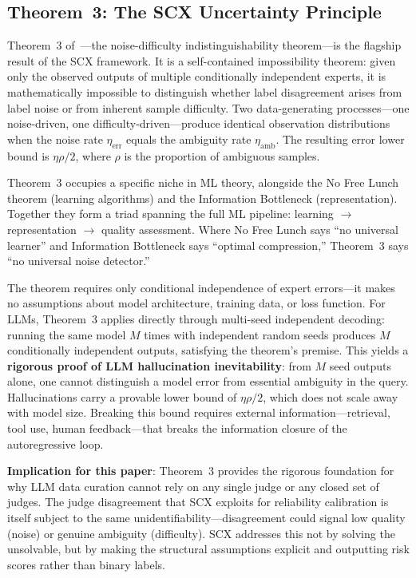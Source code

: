 \documentclass[11pt,twocolumn]{article}
\begin{document}
\subsection{Theorem~3: The SCX Uncertainty Principle}

Theorem~3 of~\cite{scx2026}---the noise-difficulty indistinguishability theorem---is the flagship result of the SCX framework. It is a self-contained impossibility theorem: given only the observed outputs of multiple conditionally independent experts, it is mathematically impossible to distinguish whether label disagreement arises from label noise or from inherent sample difficulty. Two data-generating processes---one noise-driven, one difficulty-driven---produce identical observation distributions when the noise rate $\eta_{\text{err}}$ equals the ambiguity rate $\eta_{\text{amb}}$. The resulting error lower bound is $\eta\rho/2$, where $\rho$ is the proportion of ambiguous samples.

Theorem~3 occupies a specific niche in ML theory, alongside the No Free Lunch theorem (learning algorithms) and the Information Bottleneck (representation). Together they form a triad spanning the full ML pipeline: learning $\to$ representation $\to$ quality assessment. Where No Free Lunch says ``no universal learner'' and Information Bottleneck says ``optimal compression,'' Theorem~3 says ``no universal noise detector.''

The theorem requires only conditional independence of expert errors---it makes no assumptions about model architecture, training data, or loss function. For LLMs, Theorem~3 applies directly through multi-seed independent decoding: running the same model $M$ times with independent random seeds produces $M$ conditionally independent outputs, satisfying the theorem's premise. This yields a \textbf{rigorous proof of LLM hallucination inevitability}: from $M$ seed outputs alone, one cannot distinguish a model error from essential ambiguity in the query. Hallucinations carry a provable lower bound of $\eta\rho/2$, which does not scale away with model size. Breaking this bound requires external information---retrieval, tool use, human feedback---that breaks the information closure of the autoregressive loop.

\textbf{Implication for this paper}: Theorem~3 provides the rigorous foundation for why LLM data curation cannot rely on any single judge or any closed set of judges. The judge disagreement that SCX exploits for reliability calibration is itself subject to the same unidentifiability---disagreement could signal low quality (noise) or genuine ambiguity (difficulty). SCX addresses this not by solving the unsolvable, but by making the structural assumptions explicit and outputting risk scores rather than binary labels.
\end{document}
